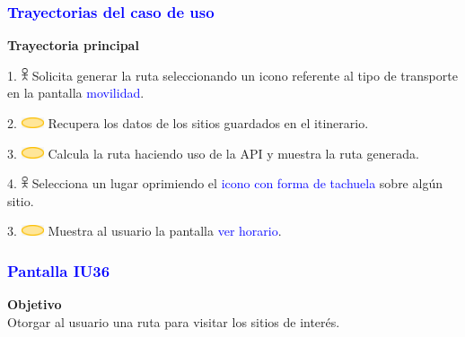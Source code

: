\subsubsection{\textcolor{blue}{Trayectorias del caso de uso}}
\textbf{Trayectoria principal}
    
    1. \includegraphics[width=0.0150\textwidth]{Figuras/persona.png} Solicita generar la ruta seleccionando un icono referente al tipo de transporte en la pantalla \textcolor{blue}{movilidad}.
    
      2. \includegraphics[width=0.0500\textwidth]{Figuras/sistema.png} Recupera los datos de los sitios guardados en el itinerario.

    3. \includegraphics[width=0.0500\textwidth]{Figuras/sistema.png} Calcula la ruta haciendo uso de la API y muestra la ruta generada.

    4. \includegraphics[width=0.0150\textwidth]{Figuras/persona.png} Selecciona un lugar oprimiendo el \textcolor{blue}{icono con forma de tachuela} sobre algún sitio.

    3. \includegraphics[width=0.0500\textwidth]{Figuras/sistema.png} Muestra al usuario la pantalla \textcolor{blue}{ver horario}.
    
\subsubsection{\textcolor{blue}{Pantalla IU36}}

\textbf{Objetivo} \\
Otorgar al usuario una ruta para visitar los sitios de interés.

